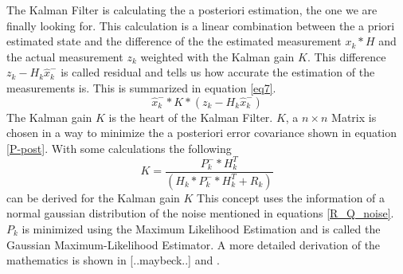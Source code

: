 The Kalman Filter is calculating the a posteriori estimation, the one we are finally looking for. This calculation is a linear combination between the a priori estimated state and the difference of the the estimated measurement $x_k*H$ and the actual measurement $z_k$ weighted with the Kalman gain $K$. This difference $z_k-H_k\hat{x}^{-}_k$ is  called residual and tells us how accurate the estimation of the measurements is. This is summarized in equation \ref{eq7}.
\begin{equation}
\hat{x}_k^{-}*K*(z_k-H_k\hat{x}^{-}_k)\label{eq7}
\end{equation}
The Kalman gain $K$ is the heart of the Kalman Filter. $K$, a $n\times n$ Matrix is chosen in a way to minimize the a posteriori error covariance shown in equation \ref{P-post}. With some calculations the following 
\begin{equation}
K=\frac{P^{-}_k*H^{T}_k}{(H_k*P^{-}_k*H^{T}_k+R_k)}
\end{equation}
can be derived for the Kalman gain $K$ \cite{welch1997} 
This concept uses the information of a normal gaussian distribution of the noise mentioned in equations \ref{R_Q_noise}. $P_k$ is minimized using the Maximum Likelihood Estimation and is called the  Gaussian Maximum-Likelihood Estimator. A more detailed derivation of the mathematics is shown in [..maybeck..] and \cite{andrews2007}.

